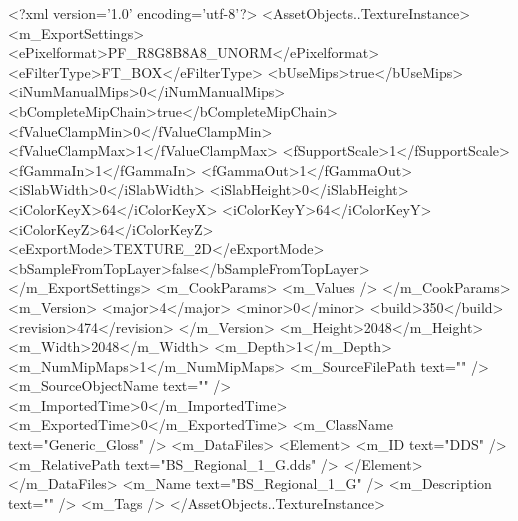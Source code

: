 <?xml version='1.0' encoding='utf-8'?>
<AssetObjects..TextureInstance>
  <m_ExportSettings>
    <ePixelformat>PF_R8G8B8A8_UNORM</ePixelformat>
    <eFilterType>FT_BOX</eFilterType>
    <bUseMips>true</bUseMips>
    <iNumManualMips>0</iNumManualMips>
    <bCompleteMipChain>true</bCompleteMipChain>
    <fValueClampMin>0</fValueClampMin>
    <fValueClampMax>1</fValueClampMax>
    <fSupportScale>1</fSupportScale>
    <fGammaIn>1</fGammaIn>
    <fGammaOut>1</fGammaOut>
    <iSlabWidth>0</iSlabWidth>
    <iSlabHeight>0</iSlabHeight>
    <iColorKeyX>64</iColorKeyX>
    <iColorKeyY>64</iColorKeyY>
    <iColorKeyZ>64</iColorKeyZ>
    <eExportMode>TEXTURE_2D</eExportMode>
    <bSampleFromTopLayer>false</bSampleFromTopLayer>
  </m_ExportSettings>
  <m_CookParams>
    <m_Values />
  </m_CookParams>
  <m_Version>
    <major>4</major>
    <minor>0</minor>
    <build>350</build>
    <revision>474</revision>
  </m_Version>
  <m_Height>2048</m_Height>
  <m_Width>2048</m_Width>
  <m_Depth>1</m_Depth>
  <m_NumMipMaps>1</m_NumMipMaps>
  <m_SourceFilePath text="" />
  <m_SourceObjectName text="" />
  <m_ImportedTime>0</m_ImportedTime>
  <m_ExportedTime>0</m_ExportedTime>
  <m_ClassName text="Generic_Gloss" />
  <m_DataFiles>
    <Element>
      <m_ID text="DDS" />
      <m_RelativePath text="BS_Regional_1_G.dds" />
    </Element>
  </m_DataFiles>
  <m_Name text="BS_Regional_1_G" />
  <m_Description text="" />
  <m_Tags />
</AssetObjects..TextureInstance>
